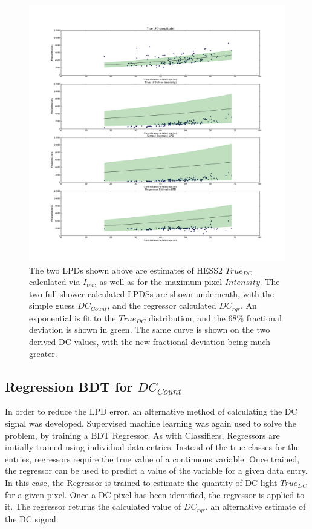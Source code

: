 \documentclass{article}
\begin{document}
\begin{figure}
\begin{center}
\includegraphics[width=\textwidth]{corsikalpd2}
\caption{The two LPDs shown above are estimates of HESS2 $True_{DC}$ calculated via $I_{tot}$, as well as for the maximum pixel $Intensity$. The two full-shower calculated LPDSs are shown underneath, with the simple guess $DC_{Count}$, and the regressor calculated $DC_{rgr}$. An exponential is fit to the $True_{DC}$ distribution, and the 68\% fractional deviation is shown in green. The same curve is shown on the two derived DC values, with the new fractional deviation being much greater.}
\label{fig:corsikalpd2}
\end{center}
\end{figure}

\subsection{Regression BDT for $DC_{Count}$}
In order to reduce the LPD error, an alternative method of calculating the DC signal was developed. Supervised machine learning was again used to solve the problem, by training a BDT Regressor. As with Classifiers, Regressors are initially trained using individual data entries. Instead of the true classes for the entries, regressors require the true value of a continuous variable. Once trained, the regressor can be used to predict a value of the variable for a given data entry. In this case, the Regressor is trained to estimate the quantity of DC light $True_{DC}$ for a given pixel. Once a DC pixel has been identified, the regressor is applied to it. The regressor returns the calculated value of $DC_{rgr}$, an alternative estimate of the DC signal. 
\end{document}
